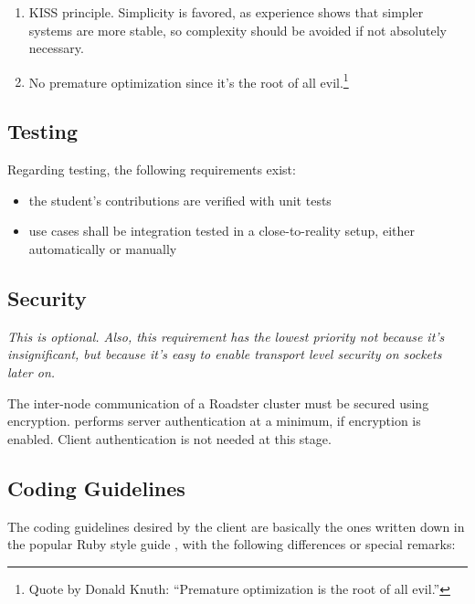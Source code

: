 \begin{enumerate}
\item \gls{KISS} principle. Simplicity is favored, as experience shows that
	simpler systems are more stable, so complexity should be avoided if not
	absolutely necessary.

\item No premature optimization since it's the root of all evil.\footnote{Quote
	by Donald Knuth: ``Premature optimization is the root of all evil.''}
\end{enumerate}


\subsection{Testing}
Regarding testing, the following requirements exist:
\begin{itemize}
	\item the student's contributions are verified with unit tests
	\item use cases shall be integration tested in a close-to-reality setup, either automatically or manually
\end{itemize}

\subsection{Security}
\emph{This is optional. Also, this requirement has the lowest priority not
because it's insignificant, but because it's easy to enable transport level
security on \zmq sockets later on.}

The inter-node communication of a Roadster cluster must be secured using
encryption. \zmq performs server authentication at a minimum, if encryption is
enabled. Client authentication is not needed at this stage.

\subsection{Coding Guidelines}
The coding guidelines desired by the client are basically the ones written down
in the popular Ruby style guide \cite{rb:style-guide}, with the following
differences or special remarks:

